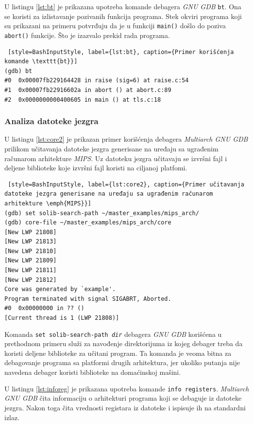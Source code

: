 \documentclass[12pt,oneside]{memoir}
\begin{document}
U listingu \ref{lst:bt} je prikazana upotreba komande debagera \emph{GNU GDB} \texttt{bt}. Ona se koristi za izlistavanje pozivanih funkcija programa. Stek okviri programa koji su prikazani na primeru potvrđuju da je u funkciji \texttt{main()} došlo do poziva \texttt{abort()} funkcije. Što je izazvalo prekid rada programa.

\begin{lstlisting} [style=BashInputStyle, label={lst:bt}, caption={Primer korišćenja komande \texttt{bt}}]
(gdb) bt
#0  0x00007fb229164428 in raise (sig=6) at raise.c:54
#1  0x00007fb22916602a in abort () at abort.c:89
#2  0x0000000000400605 in main () at tls.c:18
\end{lstlisting}

\subsubsection{Analiza datoteke jezgra}

U listingu \ref{lst:core2} je prikazan primer korišćenja debagera \emph{Multiarch GNU GDB} prilikom učitavanja datoteke jezgra generisane na uređaju sa ugrađenim računarom arhitekture \emph{MIPS}. Uz datoteku jezgra učitavaju se izvršni fajl i deljene biblioteke koje izvršni fajl koristi na ciljanoj platfomi.\newpage


\begin{lstlisting} [style=BashInputStyle, label={lst:core2}, caption={Primer učitavanja datoteke jezgra generisane na uređaju sa ugrađenim računarom arhitekture \emph{MIPS}}]
(gdb) set solib-search-path ~/master_examples/mips_arch/
(gdb) core-file ~/master_examples/mips_arch/core
[New LWP 21808]
[New LWP 21813]
[New LWP 21810]
[New LWP 21809]
[New LWP 21811]
[New LWP 21812]
Core was generated by `example'.
Program terminated with signal SIGABRT, Aborted.
#0  0x00000000 in ?? ()
[Current thread is 1 (LWP 21808)]
\end{lstlisting}

Komanda \texttt{set solib-search-path \emph{dir}} debagera \emph{GNU GDB} korišćena u prethodnom primeru služi za navođenje direktorijuma iz kojeg debager treba da koristi deljene biblioteke za učitani program. Ta komanda je veoma bitna za debagovanje programa sa platformi drugih arhitektura, jer ukoliko putanja nije navedena debager koristi biblioteke na domaćinskoj mašini.

U listingu \ref{lst:inforeg} je prikazana upotreba komande \texttt{info registers}. \emph{Multiarch GNU GDB} čita informaciju o arhitekturi programa koji se debaguje iz datoteke jezgra. Nakon toga čita vrednosti registara iz datoteke i ispisuje ih na standardni izlaz.
\end{document}
